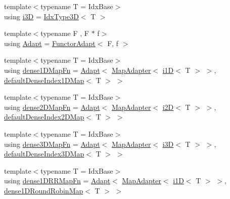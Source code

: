 \begin{DoxyCompactItemize}
\item 
{\footnotesize template$<$typename T  = Idx\+Base$>$ }\\using \hyperlink{namespacevt_1_1mapping_af435b967b9ed1ccb5ec4effdbd9abd13}{i3D} = \hyperlink{namespacevt_a65e4a83c0567ecb7a54b78e9b8e7d7ab}{Idx\+Type3D}$<$ T $>$
\item 
{\footnotesize template$<$typename F , F $\ast$ f$>$ }\\using \hyperlink{namespacevt_1_1mapping_ab3efa0ad45a85d80210d4acef3bb6c22}{Adapt} = \hyperlink{namespacevt_1_1mapping_a9502cb3a918b8389f64351638edab39f}{Functor\+Adapt}$<$ F, f $>$
\item 
{\footnotesize template$<$typename T  = Idx\+Base$>$ }\\using \hyperlink{namespacevt_1_1mapping_aaedaf84c7a2cac3bae6701cc982a76c7}{dense1\+D\+Map\+Fn} = \hyperlink{namespacevt_1_1mapping_ab3efa0ad45a85d80210d4acef3bb6c22}{Adapt}$<$ \hyperlink{namespacevt_1_1mapping_a41b113c28bb6430fbcb5be66e08ccf9f}{Map\+Adapter}$<$ \hyperlink{namespacevt_1_1mapping_af0c14a9a77e0311b3d089143ed93ba76}{i1D}$<$ T $>$ $>$, \hyperlink{namespacevt_1_1mapping_ae055a42b89a59fd6d0cc6d40f9abf3b5}{default\+Dense\+Index1\+D\+Map}$<$ T $>$ $>$
\item 
{\footnotesize template$<$typename T  = Idx\+Base$>$ }\\using \hyperlink{namespacevt_1_1mapping_aa9d0a056d56894602a35dfb8befdd812}{dense2\+D\+Map\+Fn} = \hyperlink{namespacevt_1_1mapping_ab3efa0ad45a85d80210d4acef3bb6c22}{Adapt}$<$ \hyperlink{namespacevt_1_1mapping_a41b113c28bb6430fbcb5be66e08ccf9f}{Map\+Adapter}$<$ \hyperlink{namespacevt_1_1mapping_a6448c875e0807b43f31e96fc5b0cec04}{i2D}$<$ T $>$ $>$, \hyperlink{namespacevt_1_1mapping_a011c4e2cb832d3edcd98e3803d405ad4}{default\+Dense\+Index2\+D\+Map}$<$ T $>$ $>$
\item 
{\footnotesize template$<$typename T  = Idx\+Base$>$ }\\using \hyperlink{namespacevt_1_1mapping_a9fd899bf55eeeeae4a8dac3f47fd88ad}{dense3\+D\+Map\+Fn} = \hyperlink{namespacevt_1_1mapping_ab3efa0ad45a85d80210d4acef3bb6c22}{Adapt}$<$ \hyperlink{namespacevt_1_1mapping_a41b113c28bb6430fbcb5be66e08ccf9f}{Map\+Adapter}$<$ \hyperlink{namespacevt_1_1mapping_af435b967b9ed1ccb5ec4effdbd9abd13}{i3D}$<$ T $>$ $>$, \hyperlink{namespacevt_1_1mapping_a776a69138a1fbceab5bbf10b9c07a858}{default\+Dense\+Index3\+D\+Map}$<$ T $>$ $>$
\item 
{\footnotesize template$<$typename T  = Idx\+Base$>$ }\\using \hyperlink{namespacevt_1_1mapping_a2512459116047e3e14365e1a8f41efd7}{dense1\+D\+R\+R\+Map\+Fn} = \hyperlink{namespacevt_1_1mapping_ab3efa0ad45a85d80210d4acef3bb6c22}{Adapt}$<$ \hyperlink{namespacevt_1_1mapping_a41b113c28bb6430fbcb5be66e08ccf9f}{Map\+Adapter}$<$ \hyperlink{namespacevt_1_1mapping_af0c14a9a77e0311b3d089143ed93ba76}{i1D}$<$ T $>$ $>$, \hyperlink{namespacevt_1_1mapping_a2a4e62c5dc17da0032d3953c7e3cde8b}{dense1\+D\+Round\+Robin\+Map}$<$ T $>$ $>$

\end{DoxyCompactItemize}
